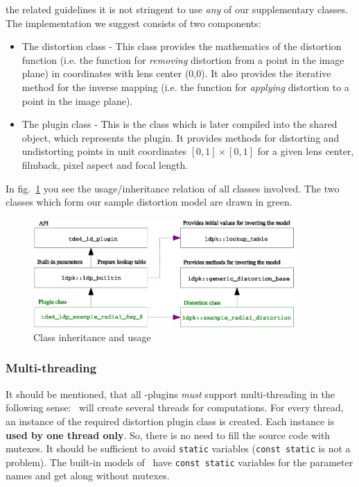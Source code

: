 \documentclass[10pt,a4paper]{article}
\begin{document}
the related guidelines it is not stringent to use {\em any} of our supplementary classes.
The implementation we suggest consists of two components:
\begin{itemize}
\item The distortion class - This class provides the mathematics of the distortion function
(i.e. the function for {\em removing} distortion from a point in the image plane)
in coordinates with lens center (0,0).
It also provides the iterative method
for the inverse mapping (i.e. the function for {\em applying} distortion to a point in the image plane).
\item The plugin class - This is the class which is later compiled into the shared object,
which represents the plugin. It provides methods for distorting and undistorting points
in unit coordinates $[0,1]\times[0,1]$ for a given lens center, filmback, pixel aspect and focal length.
\end{itemize}
In fig.~\ref{fig:ClassDiagram} you see the usage/inheritance relation of all classes involved.
The two classes which form our sample distortion model are drawn in green.
\begin{figure}[ht]
\centering
\includegraphics[width=10cm]{class_diagram}
\caption{Class inheritance and usage}
\label{fig:ClassDiagram}
\end{figure}

\subsubsection{Multi-threading}
It should be mentioned, that all \tde-plugins {\em must} support multi-threading in the following sense:
\tde\ will create several threads for computations. For every thread, an instance of the
required distortion plugin class is created. Each instance is {\bf used by one thread only}.
So, there is no need to fill the source code with mutexes.
It should be sufficient to avoid {\tt static} variables ({\tt const static} is not a problem).
The built-in models of \tde\ have {\tt const static} variables for the parameter names
and get along without mutexes.
\end{document}
